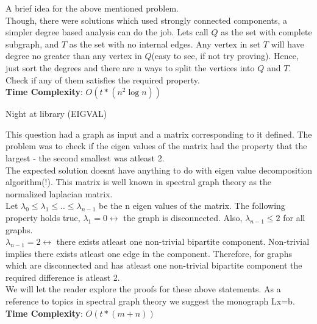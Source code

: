 \documentclass[solution,addpoints,12pt]{exam}
\begin{document}
\begin{questions}
\begin{solution}
  A brief idea for the above mentioned problem. \\
  Though, there were solutions which used strongly connected components, a simpler degree based analysis can do the job. Lets call $Q$ as the set with
  complete subgraph, and $T$ as the set with no internal edges. Any vertex in set $T$ will have degree no greater than any vertex in $Q$(easy to see, if not
  try proving). Hence, just sort the degrees and there are n ways to split the vertices into $Q$ and $T$. Check if any of them satisfies the required property.\\
  
  \textbf{Time Complexity}: $O(t \ast (n^2 \log n))$
  
\end{solution}

\question
  Night at library (EIGVAL)

\begin{solution}
  This question had a graph as input and a matrix corresponding to it defined. The problem was to check if the eigen values of the 
  matrix had the property that the largest - the second smallest was atleast 2. \\
  
  The expected solution doesnt have anything to do with eigen value decomposition algorithm(!). This matrix is well known in spectral graph theory
  as the normalized laplacian matrix. \\
  
  Let $\lambda_0 \leq \lambda_1 \leq  ..  \leq \lambda_{n-1}$ be the n eigen values of the matrix. The following property holds true,
  $\lambda_1 = 0 \leftrightarrow$ the graph is disconnected. Also, $\lambda_{n-1} \leq 2$ for all graphs. \\
  $\lambda_{n-1} = 2 \leftrightarrow$ there exists atleast one non-trivial bipartite component. Non-trivial implies there exists atleast one edge in the
  component. Therefore, for graphs which are disconnected and has atleast one non-trivial bipartite component the required difference is atleast 2.\\
  
  We will let the reader explore the proofs for these above statements. As a reference to topics in spectral graph theory we suggest the monograph
  Lx=b. \\
  
  \textbf{Time Complexity}: $O(t \ast (m+n))$
 
\end{solution}


\end{questions}
\end{document}
